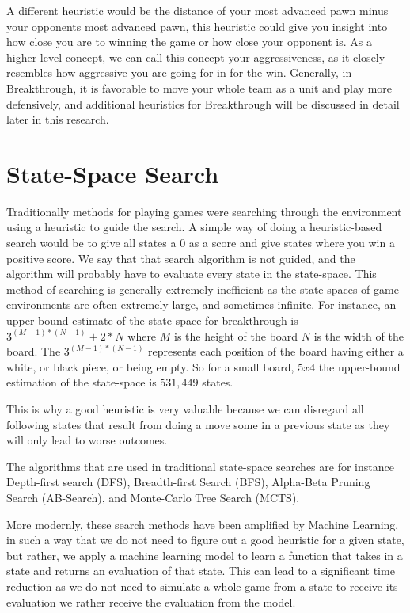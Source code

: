 A different heuristic would be the distance of your most advanced pawn minus your opponents most advanced pawn, this heuristic could give you insight into how close you are to winning the game or how close your opponent is. As a higher-level concept, we can call this concept your aggressiveness, as it closely resembles how aggressive you are going for in for the win. Generally, in Breakthrough, it is favorable to move your whole team as a unit and play more defensively, and additional heuristics for Breakthrough will be discussed in detail later in this research.

\section{State-Space Search}

Traditionally methods for playing games were searching through the environment using a heuristic to guide the search. A simple way of doing a heuristic-based search would be to give all states a $0$ as a score and give states where you win a positive score. We say that that search algorithm is not guided, and the algorithm will probably have to evaluate every state in the state-space. This method of searching is generally extremely inefficient as the state-spaces of game environments are often extremely large, and sometimes infinite. For instance, an upper-bound estimate of the state-space for breakthrough is $3^{(M-1)*(N-1)}+2*N$ where $M$ is the height of the board $N$ is the width of the board. The $3^{(M-1)*(N-1)}$ represents each position of the board having either a white, or black piece, or being empty. So for a small board, $5x4$ the upper-bound estimation of the state-space is $531,449$ states.

This is why a good heuristic is very valuable because we can disregard all following states that result from doing a move some in a previous state as they will only lead to worse outcomes.

The algorithms that are used in traditional state-space searches are for instance Depth-first search (DFS), Breadth-first Search (BFS), Alpha-Beta Pruning Search (AB-Search), and Monte-Carlo Tree Search (MCTS).

More modernly, these search methods have been amplified by Machine Learning, in such a way that we do not need to figure out a good heuristic for a given state, but rather, we apply a machine learning model to learn a function that takes in a state and returns an evaluation of that state.\cite{neuralnetworksgames:michulke} This can lead to a significant time reduction as we do not need to simulate a whole game from a state to receive its evaluation we rather receive the evaluation from the model.

